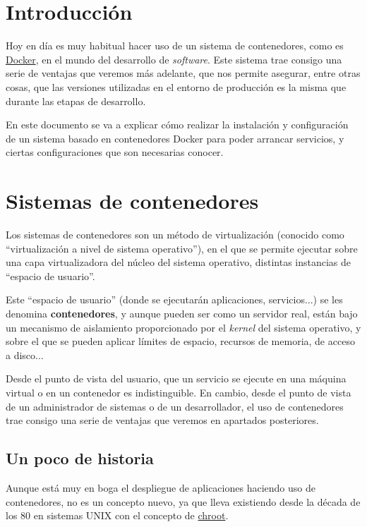 \chapter{Introducción}

Hoy en día es muy habitual hacer uso de un sistema de contenedores, como es \href{https://docs.docker.com/}{Docker}, en el mundo del desarrollo de \textit{software}. Este sistema trae consigo una serie de ventajas que veremos más adelante, que nos permite asegurar, entre otras cosas, que las versiones utilizadas en el entorno de producción es la misma que durante las etapas de desarrollo.

En este documento se va a explicar cómo realizar la instalación y configuración de un sistema basado en contenedores Docker para poder arrancar servicios, y ciertas configuraciones que son necesarias conocer.

\chapter{Sistemas de contenedores}

Los sistemas de contenedores son un método de virtualización (conocido como “virtualización a nivel de sistema operativo”), en el que se permite ejecutar sobre una capa virtualizadora del núcleo del sistema operativo, distintas instancias de “espacio de usuario”.

Este “espacio de usuario” (donde se ejecutarán aplicaciones, servicios...) se les denomina \textbf{contenedores}, y aunque pueden ser como un servidor real, están bajo un mecanismo de aislamiento proporcionado por el \textit{kernel} del sistema operativo, y sobre el que se pueden aplicar límites de espacio, recursos de memoria, de acceso a disco...


Desde el punto de vista del usuario, que un servicio se ejecute en una máquina virtual o en un contenedor es indistinguible. En cambio, desde el punto de vista de un administrador de sistemas o de un desarrollador, el uso de contenedores trae consigo una serie de ventajas que veremos en apartados posteriores.


\section{Un poco de historia}
Aunque está muy en boga el despliegue de aplicaciones haciendo uso de contenedores, no es un concepto nuevo, ya que lleva existiendo desde la década de los 80 en sistemas UNIX con el concepto de \href{https://es.wikipedia.org/wiki/Chroot}{chroot}.

